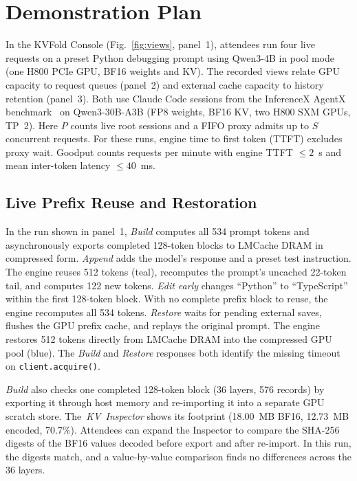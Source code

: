 \documentclass[conference]{IEEEtran}
\begin{document}
\raggedbottom
\section{Demonstration Plan}
\label{sec:demo}
In the KVFold Console (Fig.~\ref{fig:views}, panel~1), attendees run four
live requests on a preset Python debugging prompt using Qwen3-4B in pool mode
(one H800 PCIe GPU, BF16 weights and KV). The recorded views relate GPU
capacity to request queues (panel~2) and external cache capacity to history
retention (panel~3). Both use Claude Code sessions from the InferenceX AgentX
benchmark~\cite{agentx} on Qwen3-30B-A3B (FP8 weights, BF16 KV, two H800
SXM GPUs, TP~2). Here $P$ counts live root sessions and a FIFO proxy admits
up to $S$ concurrent requests. For these runs, engine time to first token
(TTFT) excludes proxy wait. Goodput counts requests per minute with engine
TTFT $\le 2$~s and mean inter-token latency $\le 40$~ms.

\subsection*{Live Prefix Reuse and Restoration}
In the run shown in panel~1, \emph{Build} computes all 534 prompt tokens and
asynchronously exports completed 128-token blocks to LMCache DRAM in compressed
form. \emph{Append} adds the model's response and a preset test instruction.
The engine reuses 512 tokens (teal), recomputes the prompt's uncached 22-token
tail, and computes 122 new tokens. \emph{Edit early} changes
``Python'' to ``TypeScript'' within the first 128-token block. With no complete
prefix block to reuse, the engine recomputes all 534 tokens.
\emph{Restore} waits for pending external saves, flushes the GPU prefix cache,
and replays the original prompt. The engine restores 512 tokens directly
from LMCache DRAM into the compressed GPU pool (blue). The \emph{Build} and
\emph{Restore} responses both identify the missing timeout on
\texttt{client.acquire()}.

\emph{Build} also checks one completed 128-token block (36 layers, 576 records)
by exporting it through host memory and re-importing it into a separate GPU
scratch store. \mbox{The \emph{KV Inspector}}
shows its footprint (18.00~MB BF16, 12.73~MB encoded, 70.7\%). Attendees can
expand the Inspector to compare the SHA-256 digests of the BF16 values decoded
before export and after re-import. In this run, the digests match, and a
value-by-value comparison finds no differences across the 36 layers.
\end{document}

